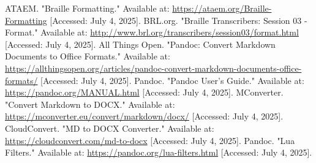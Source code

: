 \begin{thebibliography}{99}
	 ATAEM. "Braille Formatting." Available at: \url{https://ataem.org/Braille-Formatting} [Accessed: July 4, 2025].
	 BRL.org. "Braille Transcribers: Session 03 - Format." Available at: \url{http://www.brl.org/transcribers/session03/format.html} [Accessed: July 4, 2025].
	 All Things Open. "Pandoc: Convert Markdown Documents to Office Formats." Available at: \url{https://allthingsopen.org/articles/pandoc-convert-markdown-documents-office-formats/} [Accessed: July 4, 2025].
	 Pandoc. "Pandoc User’s Guide." Available at: \url{https://pandoc.org/MANUAL.html} [Accessed: July 4, 2025].
	 MConverter. "Convert Markdown to DOCX." Available at: \url{https://mconverter.eu/convert/markdown/docx/} [Accessed: July 4, 2025].
	 CloudConvert. "MD to DOCX Converter." Available at: \url{https://cloudconvert.com/md-to-docx} [Accessed: July 4, 2025].
	 Pandoc. "Lua Filters." Available at: \url{https://pandoc.org/lua-filters.html} [Accessed: July 4, 2025].
\end{thebibliography}
